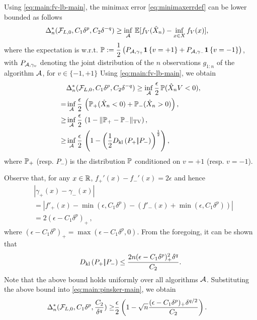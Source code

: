 Using \eqref{eq:main:fv-lb-main}, the minimax error \eqref{eq:minimaxerrdef} can be lower bounded as follows
\begin{align*}
\MoveEqLeft 
\Delta_n^*(\F_{L,0}, C_1 \delta^p ,C_2 \delta^{-q}) %
  \ge  \inf_{\A} \,  \E[f_V(\hat X_n) - \inf_{x \in X}
  f_V(x)],
  \end{align*}
where the expectation is w.r.t. $\P:= \dfrac{1}{2} \left(P_{\A, \gamma_+} \indic{v=+1} + P_{\A, \gamma_-}\indic{v=-1}\right)$, with $P_{\A,\gamma_v}$ denoting the joint distribution of the $n$ observations $g_{1:n}$ of the algorithm $\A$, for $v \in \{-1,+1\}$
Using \eqref{eq:main:fv-lb-main}, we obtain
\begin{align}
&\Delta_n^*(\F_{L,0}, C_1 \delta^p ,C_2 \delta^{-q})  \ge  \inf_{\A} \dfrac{\epsilon}{2}\,  \P(\hat X_n V < 0), \label{eq:main:strong-convex-bd}\\
  = & \inf_{\A} \dfrac{\epsilon }{2} \, \left(\P_{+}(\hat X_n < 0) + \P_{-}(\hat X_n > 0)\right), \label{eq:main:Pplus}\\
  \ge &\inf_{\A} \dfrac{\epsilon }{2} \,\left(1 - \tvnorm{\P_{+}- \P_{-}}\right), \label{eq:main:lecam}\\
  \ge &\inf_{\A} \dfrac{\epsilon }{2}  \,\left( 1 - \left(\frac12\dkl{P_{+}}{P_{-}}\right)^{\frac{1}{2}}\right), \label{eq:main:pinsker-main}
\end{align}
where $\P_{+}$ (resp. $P_-$) is the distribution $\P$ conditioned on $v=+1$ (resp. $v=-1$).

Observe that, for any $x\in \R$, $f_+'(x) - f_-'(x) = 2\epsilon$ and hence
\begin{align}
& |\gamma_+(x) - \gamma_-(x)| \nonumber\\
& = | f'_+(x) - \min(\epsilon,C_1 \delta^p) - (f'_-(x)+\min(\epsilon,C_1 \delta^p)) | \nonumber \\
& = 2 (\epsilon - C_1 \delta^p)_+\,,
 \label{eq:main:gdiff-ub}
\end{align}
where $(\epsilon - C_1 \delta^p)_+ = \max(\epsilon - C_1 \delta^p,0)$. 
From the foregoing, it can be shown that 
\begin{align}
\dkl{P_{+}}{P_{-}} \le \dfrac{2n(\epsilon-C_1\delta^p)_+^2 \delta^q}{C_2}.\label{eq:main:dkbd-main}
\end{align}
Note that the above bound holds uniformly over all algorithms $\A$. 
Substituting the above bound into \eqref{eq:main:pinsker-main}, we obtain 
\begin{align*}
 \Delta_n^*(\F_{L,0}, C_1 \delta^p ,\frac{C_2}{\delta^{q}})
  \ge & \frac{\epsilon}{2} \left(1 - \sqrt{
    n}  \frac{(\epsilon-C_1\delta^p)_+\delta^{q/2}}{C_2}
  \right).\label{eq:main:final-lower-bd}
\end{align*}



